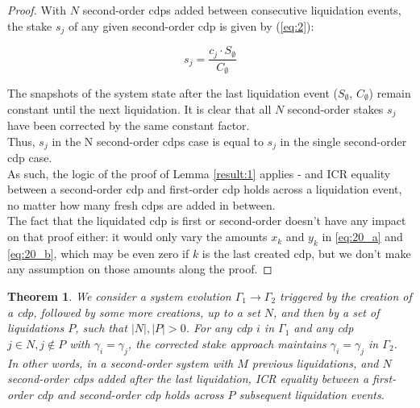 \documentclass[reqno]{article}
\newtheorem{theorem}{Theorem}[section]
\begin{document}
\begin{proof}
With $N$ second-order cdps added between consecutive liquidation events, the stake $s_j$ of any given second-order cdp is given by (\ref{eq:2}):

\begin{equation} 
    s_j=\frac{c_j \cdot S_\emptyset}{C_\emptyset}
\end{equation}

\bigskip
The snapshots of the system state after the last liquidation event ($S_\emptyset$, $C_\emptyset$) remain constant until the next liquidation. It is clear that all $N$ second-order stakes $s_j$ have been corrected by the same constant factor.\\

Thus, $s_j$ in the N second-order cdps case is equal to $s_j$ in the single second-order cdp case.\\

As such, the logic of the proof of Lemma \ref{result:1} applies - and ICR equality between a second-order cdp and first-order cdp holds across a liquidation event, no matter how many fresh cdps are added in between.\\
The fact that the liquidated cdp is first or second-order doesn’t have any impact on that proof either: it would only vary the amounts $x_k$ and $y_k$ in \ref{eq:20_a} and \ref{eq:20_b}, which may be even zero if $k$ is the last created cdp, but we don’t make any assumption on those amounts along the proof.
\end{proof}

\begin{theorem} \label{result:4}
We consider a system evolution $\Gamma_1 \rightarrow \Gamma_2$ triggered by the creation of a cdp, followed by some more creations, up to a set $N$, and then by a set of liquidations $P$, such that $|N|, |P| > 0$. For any cdp $i$ in $\Gamma_1$ and any cdp $j \in N, j\notin P$ with $\gamma_i = \gamma_j$, the corrected stake approach maintains $\gamma_i = \gamma_j$ in $\Gamma_2$. \\
In other words, in a second-order system with $M$ previous liquidations, and $N$ second-order cdps added after the last liquidation, ICR equality between a first-order cdp and second-order cdp holds across $P$ subsequent liquidation events.
\end{theorem}
\end{document}

